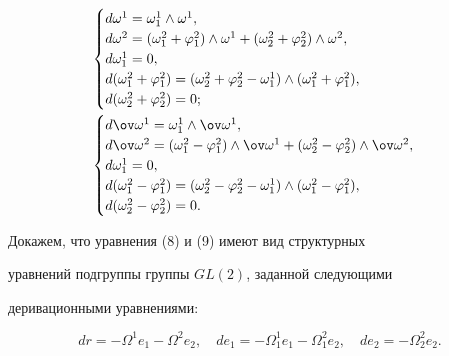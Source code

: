 \begin{align} 


& 


\begin{cases} 


d\omega^1=\omega^1_1\wedge\omega^1, \\ 


d\omega^2=(\omega^2_1+\varphi^2_1)\wedge\omega^1+ 


(\omega^2_2+\varphi^2_2)\wedge\omega^2, \\ 


d\omega^1_1=0, \\ 


d(\omega^2_1+\varphi^2_1)=(\omega^2_2+\varphi^2_2-\omega^1_1) 


\wedge(\omega^2_1+\varphi^2_1), \\ 


d(\omega^2_2+\varphi^2_2)=0; 


\end{cases} 


\\ 


& 


\begin{cases} 


d\ov\omega^1=\omega^1_1\wedge\ov\omega^1, \\ 


d\ov\omega^2=(\omega^2_1-\varphi^2_1)\wedge\ov\omega^1+ 


(\omega^2_2-\varphi^2_2)\wedge\ov\omega^2, \\ 


d\omega^1_1=0, \\ 


d(\omega^2_1-\varphi^2_1)=(\omega^2_2-\varphi^2_2-\omega^1_1) 


\wedge(\omega^2_1-\varphi^2_1), \\ 


d(\omega^2_2-\varphi^2_2)=0. 


\end{cases} 


\end{align} 


Докажем, что уравнения (8) и (9) имеют вид структурных 


уравнений подгруппы группы $GL(2)$, заданной следующими 


деривационными уравнениями: 


\begin{equation} 


dr=-\Omega^1e_1-\Omega^2e_2,\quad 


de_1=-\Omega^1_1e_1-\Omega^2_1e_2,\quad 


de_2=-\Omega^2_2e_2. 


\end{equation} 


